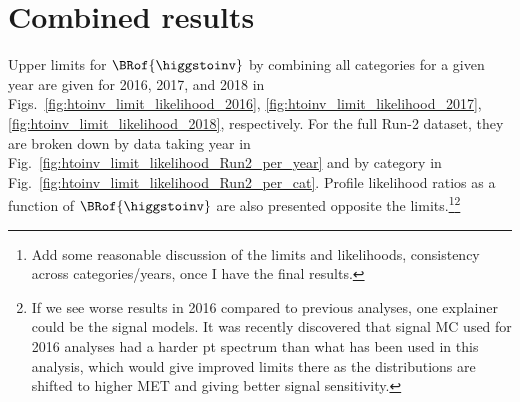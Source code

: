 \clearpage




\section{Combined results}
\label{sec:htoinv_combined_results}


Upper limits for $\BRof{\higgstoinv}$ by combining all categories for a given year are given for 2016, 2017, and 2018 in Figs.~\ref{fig:htoinv_limit_likelihood_2016}, \ref{fig:htoinv_limit_likelihood_2017}, \ref{fig:htoinv_limit_likelihood_2018}, respectively. For the full Run-2 dataset, they are broken down by data taking year in Fig.~\ref{fig:htoinv_limit_likelihood_Run2_per_year} and by category in Fig.~\ref{fig:htoinv_limit_likelihood_Run2_per_cat}. Profile likelihood ratios as a function of $\BRof{\higgstoinv}$ are also presented opposite the limits.\footnote{Add some reasonable discussion of the limits and likelihoods, consistency across categories/years, once I have the final results.}\footnote{If we see worse results in 2016 compared to previous analyses, one explainer could be the signal models. It was recently discovered that signal MC used for 2016 analyses had a harder pt spectrum than what has been used in this analysis, which would give improved limits there as the distributions are shifted to higher MET and giving better signal sensitivity.}

